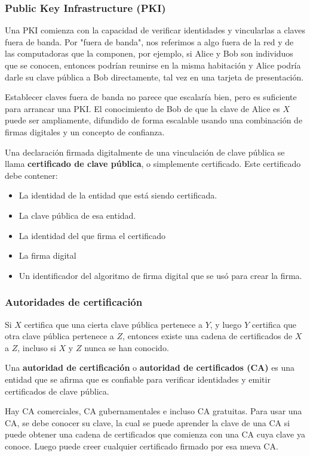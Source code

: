 \subsubsection*{Public Key Infrastructure (PKI)}
Una PKI comienza con la capacidad de verificar identidades y vincularlas a claves fuera de banda. Por "fuera de banda", nos referimos a algo fuera de la red y de las computadoras que la componen, por ejemplo, si Alice y Bob son individuos que se conocen, entonces podrían reunirse en la misma habitación y Alice podría darle su clave pública a Bob directamente, tal vez en una tarjeta de presentación.

Establecer claves fuera de banda no parece que escalaría bien, pero es suficiente para arrancar una PKI. El conocimiento de Bob de que la clave de Alice es \(X\) puede ser ampliamente, difundido de forma escalable usando una combinación de firmas digitales y un concepto de confianza.

Una declaración firmada digitalmente de una vinculación de clave pública se llama \textbf{certificado de clave pública}, o simplemente certificado. Este certificado debe contener:
\begin{itemize}
  \item La identidad de la entidad que está siendo certificada.
  \item La clave pública de esa entidad.
  \item La identidad del que firma el certificado
  \item La firma digital
  \item Un identificador del algoritmo de firma digital que se usó para crear la firma.
\end{itemize}

\subsubsection*{Autoridades de certificación}
Si \(X\) certifica que una cierta clave pública pertenece a \(Y\), y luego \(Y\) certifica que otra clave pública pertenece a \(Z\), entonces existe una cadena de certificados de \(X\) a \(Z\), incluso si \(X\) y \(Z\) nunca se han conocido.

Una \textbf{autoridad de certificación} o \textbf{autoridad de certificados (CA)} es una entidad que se afirma que es confiable para verificar identidades y emitir certificados de clave pública.

Hay CA comerciales, CA gubernamentales e incluso CA gratuitas. Para usar una CA, se debe conocer su clave, la cual se puede aprender la clave de una CA si puede obtener una cadena de certificados que comienza con una CA cuya clave ya conoce. Luego puede creer cualquier certificado firmado por esa nueva CA. 

